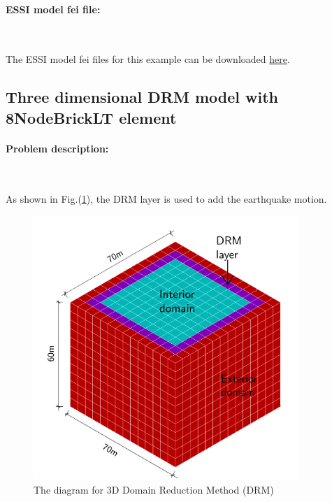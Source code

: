 \documentclass[fleqn,11pt]{article}
\begin{document}
\paragraph{ESSI model fei file: } ~



The ESSI model fei files for this example can be downloaded \href{https://github.com/yuan-energy/Real-ESSI-Examples/blob/master/model_fei_file/DRM_1D/DRM_1D.tgz?raw=true}{here}.






\vskip 20pt
\subsection{Three dimensional DRM model with 8NodeBrickLT element}

\paragraph{Problem description:} ~

As shown in Fig.(\ref{fig The diagram for Domain Reduction Method DRM }), the DRM layer is used to add the earthquake motion. 


\begin{figure}[H]
  \centering
  \includegraphics[width=10cm]{../Figure-files/DRM_3D_descp_3.pdf}
  \caption{The diagram for 3D Domain Reduction Method (DRM) }
  \label{fig The diagram for Domain Reduction Method DRM }
\end{figure}
\end{document}
